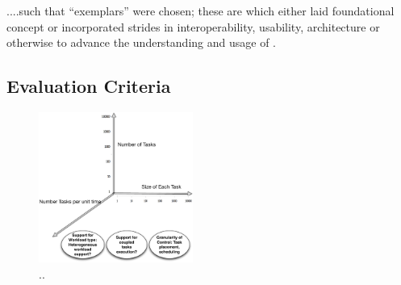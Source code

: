 \documentclass{sig-alternate}
\begin{document}
 ....such that ``exemplars'' were chosen; these
are \pilotjobs which either laid foundational \pilotjob concept or
incorporated strides in interoperability, usability, architecture or
otherwise to advance the understanding and usage of \pilotjobs.




\subsection{Evaluation Criteria}\label{ssec:evaluation}

\begin{figure}[t]
	\centering
		\includegraphics[width=0.45\textwidth]{figures/pilot-criteria}
                \caption{..}
\end{figure}

\end{document}
